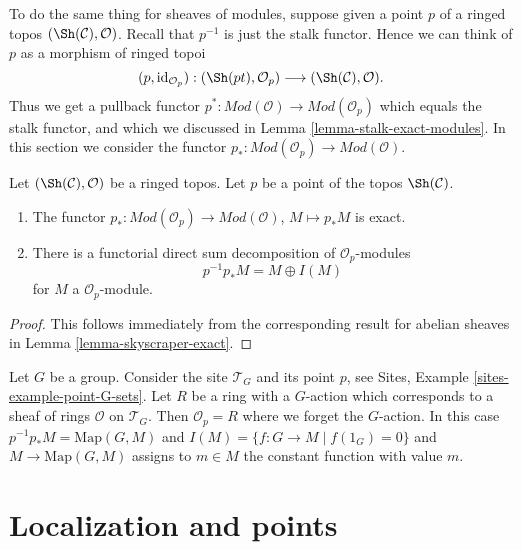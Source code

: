 \noindent
To do the same thing for sheaves of modules, suppose given a point
$p$ of a ringed topos $(\Sh(\mathcal{C}), \mathcal{O})$.
Recall that $p^{-1}$ is just the stalk functor.
Hence we can think of $p$ as a morphism of ringed topoi
$$
(p, \text{id}_{\mathcal{O}_p}) :
(\Sh(pt), \mathcal{O}_p)
\longrightarrow
(\Sh(\mathcal{C}), \mathcal{O}).
$$
Thus we get a pullback functor
$p^* : \textit{Mod}(\mathcal{O}) \to \textit{Mod}(\mathcal{O}_p)$
which equals the stalk functor, and which we discussed in
Lemma \ref{lemma-stalk-exact-modules}.
In this section we consider the functor
$p_* : \textit{Mod}(\mathcal{O}_p) \to \textit{Mod}(\mathcal{O})$.

\begin{lemma}
\label{lemma-skyscraper-modules-exact}
Let $(\Sh(\mathcal{C}), \mathcal{O})$ be a ringed topos.
Let $p$ be a point of the topos $\Sh(\mathcal{C})$.
\begin{enumerate}
\item The functor
$p_* : \textit{Mod}(\mathcal{O}_p) \to \textit{Mod}(\mathcal{O})$,
$M \mapsto p_*M$ is exact.
\item There is a functorial direct sum decomposition of
$\mathcal{O}_p$-modules
$$
p^{-1}p_*M = M \oplus I(M)
$$
for $M$ a $\mathcal{O}_p$-module.
\end{enumerate}
\end{lemma}

\begin{proof}
This follows immediately from the corresponding result for abelian
sheaves in
Lemma \ref{lemma-skyscraper-exact}.
\end{proof}

\begin{example}
\label{example-ring-with-group-action}
Let $G$ be a group. Consider the site
$\mathcal{T}_G$ and its point $p$, see
Sites, Example \ref{sites-example-point-G-sets}.
Let $R$ be a ring with a $G$-action which corresponds to
a sheaf of rings $\mathcal{O}$ on $\mathcal{T}_G$.
Then $\mathcal{O}_p = R$ where we forget the $G$-action.
In this case $p^{-1}p_*M = \text{Map}(G, M)$ and
$I(M) = \{f : G \to M \mid f(1_G) = 0\}$ and
$M \to \text{Map}(G, M)$ assigns to $m \in M$ the constant
function with value $m$.
\end{example}




\section{Localization and points}
\label{section-localize-points}

